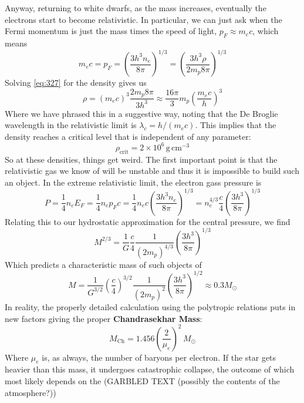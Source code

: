 \documentclass[10pt]{article}
\numberwithin{equation}{section}
\newcommand{\n}{\noindent}
\begin{document}
    \n Anyway, returning to white dwarfs, as the mass increases,
    eventually the electrons start to become relativistic. In
    particular, we can just ask when the Fermi momentum is just the
    mass times the speed of light, $p_F\approx m_ec$, which means
    \begin{equation}
      \label{eq:327}
      m_ec=p_F=\left(\frac{3h^3n_e}{8\pi}\right)^{1/3}=\left(\frac
{3h^3\rho}{2m_p8\pi}\right)^{1/3}
    \end{equation}
    Solving \eqref{eq:327} for the density gives us
    \begin{equation}
      \label{eq:328}
      \rho= (m_e c)^3\frac{2m_p 8\pi}{3 h^3}\approx \frac{16
        \pi}{3}m_p\left(\frac{m_e c}{h}\right)^3
    \end{equation}
    Where we have phrased this in a suggestive way, noting that the De
    Broglie wavelength in the relativistic limit is
    $\lambda_c=h/(m_ec)$. This implies that the density reaches a
    critical level that is independent of any parameter:
    \begin{equation}
      \label{eq:329}
      \boxed{\rho_{\mathrm{crit}}=2\times 10^6\,\mathrm{g\,cm^{-3}}}
    \end{equation}
    So at these densities, things get weird. The first important point
    is that the relativistic gas we know of will be unstable and thus
    it is impossible to build such an object. In the extreme
    relativistic limit, the electron gass pressure is
    \begin{equation}
      \label{eq:330}
      P=\frac{1}{4}n_e E_F=\frac{1}{4}n_e p_F c=\frac{1}{4} n_ec\left(\frac
{3h^3n_e}{8\pi}\right)^{1/3}=n_e^{4/3}\frac{c}{4}\left(\frac{3h^3}{8\pi}
\right)^{1/3}
    \end{equation}
    Relating this to our hydrostatic approximation for the central
    pressure, we find
    \begin{equation}
      \label{eq:331}
      M^{2/3}=\frac{1}{G}\frac{c}{4}\frac{1}{(2m_p)^{4/3}}\left(\frac{3h^3}
{8\pi}\right)^{1/3}
    \end{equation}
    Which predicts a characteristic mass of such objects of
    \begin{equation}
      \label{eq:332}
      M=\frac{1}{G^{3/2}}\left(\frac{c}{4}\right)^{3/2}\frac{1}{(2m_p)
^2}\left(\frac{3h^3}{8\pi}\right)^{1/2}
      \approx 0.3 M_\odot
    \end{equation}
    In reality, the properly detailed calculation using the polytropic
    relations puts in new factors giving the proper
    \textbf{Chandrasekhar Mass}:
    \begin{equation}
      \label{eq:333}
      \boxed{M_{\mathrm{Ch}}=1.456\left(\frac{2}{\mu_e}\right)^2\,M_\odot}
    \end{equation}
    Where $\mu_e$ is, as always, the number of baryons per electron.
    If the star gets heavier than this mass, it undergoes catastrophic
    collapse, the outcome of which most likely depends on the (GARBLED
    TEXT (possibly the contents of the atmosphere?))
\end{document}
